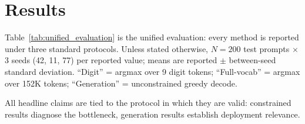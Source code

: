 \documentclass{article}
\begin{document}
\section{Results}
\label{sec:results}

Table~\ref{tab:unified_evaluation} is the unified evaluation: every method is reported under three standard protocols.
Unless stated otherwise, $N{=}200$ test prompts $\times$ 3 seeds (42, 11, 77) per reported value; means are reported $\pm$ between-seed standard deviation.
``Digit'' = argmax over 9 digit tokens; ``Full-vocab'' = argmax over 152K tokens; ``Generation'' = unconstrained greedy decode.

\begin{table}[h]
\centering
\small
All headline claims are tied to the protocol in which they are valid: constrained results diagnose the bottleneck, generation results establish deployment relevance.\vspace{2pt}


\end{table}
\end{document}
